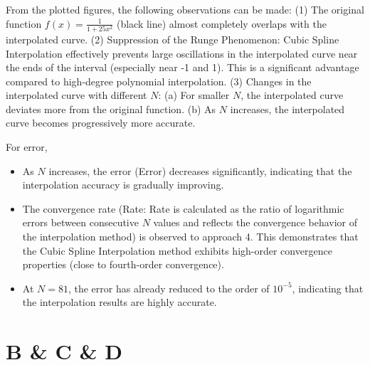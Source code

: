 \documentclass[a4paper]{article}
\begin{document}
From the plotted figures, the following observations can be made:
(1) The original function \( f(x) = \frac{1}{1 + 25x^2} \) (black line) almost completely overlaps with the interpolated curve.
(2) Suppression of the Runge Phenomenon: Cubic Spline Interpolation effectively prevents large oscillations in the interpolated curve near the ends of the interval (especially near -1 and 1). This is a significant advantage compared to high-degree polynomial interpolation.
(3) Changes in the interpolated curve with different \( N \):
(a) For smaller \( N \), the interpolated curve deviates more from the original function.
(b) As \( N \) increases, the interpolated curve becomes progressively more accurate.

For error,
\begin{itemize}
    \item As \( N \) increases, the error (Error) decreases significantly, indicating that the interpolation accuracy is gradually improving.  
    \item The convergence rate (Rate: Rate is calculated as the ratio of logarithmic errors between consecutive \( N \) values and reflects the convergence behavior of the interpolation method) is observed to approach 4. This demonstrates that the Cubic Spline Interpolation method exhibits high-order convergence properties (close to fourth-order convergence).  
    \item At \( N = 81 \), the error has already reduced to the order of \( 10^{-5} \), indicating that the interpolation results are highly accurate.  
\end{itemize}

\section*{B \& C \& D}
\end{document}
